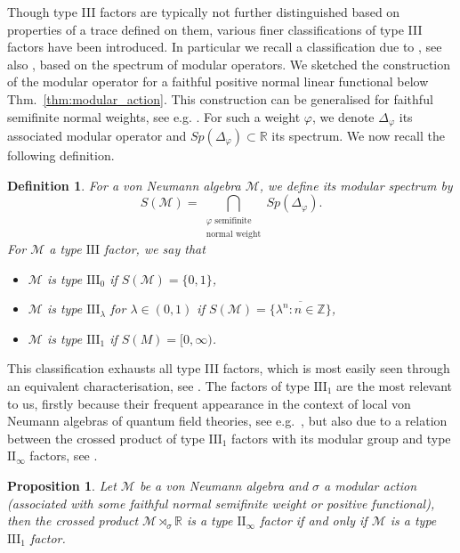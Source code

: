 \documentclass[sn-mathphys-num]{sn-jnl}%
\newcommand{\RR}{\mathbb{R}}
\newcommand{\MM}{\mathcal{M}}
\numberwithin{equation}{section}
\theoremstyle{thmstyleone}%
\newtheorem{proposition}[theorem]{Proposition}%
\theoremstyle{thmstyletwo}%
\theoremstyle{thmstylethree}%
\newtheorem{definition}[theorem]{Definition}%
\begin{document}
    Though type III factors are typically not further distinguished based on properties of a trace defined on them, various finer classifications of type III factors have been introduced. In particular we recall a classification due to \cite{Connes1973}, see also \cite[Ch.\ XII]{takesaki2002}, based on the spectrum of modular operators. We sketched the construction of the modular operator for a faithful positive normal linear functional below Thm.\ \ref{thm:modular_action}. This construction can be generalised for faithful semifinite normal weights, see e.g. \cite[Thm.\ VIII.1.2]{takesaki2002}. For such a weight $\varphi$, we denote $\Delta_\varphi$ its associated modular operator and $Sp(\Delta_\varphi)\subset\RR$ its spectrum. We now recall the following definition.
    \begin{definition}
        For a von Neumann algebra $\MM$, we define its \textup{modular spectrum} by
        \begin{equation}
            S(\MM)=\bigcap_{\substack{\varphi\text{ semifinite}\\\text{normal weight}}}Sp(\Delta_\varphi).
        \end{equation}
        For $\MM$ a type $\mathrm{III}$ factor, we say that
        \begin{itemize}
            \item $\MM$ is type $\mathrm{III}_0$ if $S(\MM)=\{0,1\}$,
            \item $\MM$ is type $\mathrm{III}_\lambda$ for $\lambda\in (0,1)$ if $S(\MM)=\overline{\{\lambda^n:n\in\mathbb{Z}\}}$,
            \item $\MM$ is type $\mathrm{III}_1$ if $S(M)=[0,\infty)$.
        \end{itemize}
    \end{definition}
    This classification exhausts all type III factors, which is most easily seen through an equivalent characterisation, see \cite[Def.\ XII.1.5 and Thm.\ XII.1.6]{takesaki2002}. The factors of type $\mathrm{III}_1$ are the most relevant to us, firstly because their frequent appearance in the context of local von Neumann algebras of quantum field theories, see e.g.\ \cite{fredenhagen1985modular,Verch:1996wv}, but also due to a relation between the crossed product of type $\mathrm{III}_1$ factors with its modular group and type $\mathrm{II}_\infty$ factors, see \cite[Cor. 9.7]{Takesaki1973duality}.
    \begin{proposition}
        \label{prop:type3to2fact}
        Let $\MM$ be a von Neumann algebra and $\sigma$ a modular action (associated with some faithful normal semifinite weight or positive functional), then the crossed product $\MM\rtimes_\sigma\RR$ is a type $\mathrm{II}_\infty$ factor if and only if $\MM$ is a type $\mathrm{III}_1$ factor.
    \end{proposition}
\end{document}
